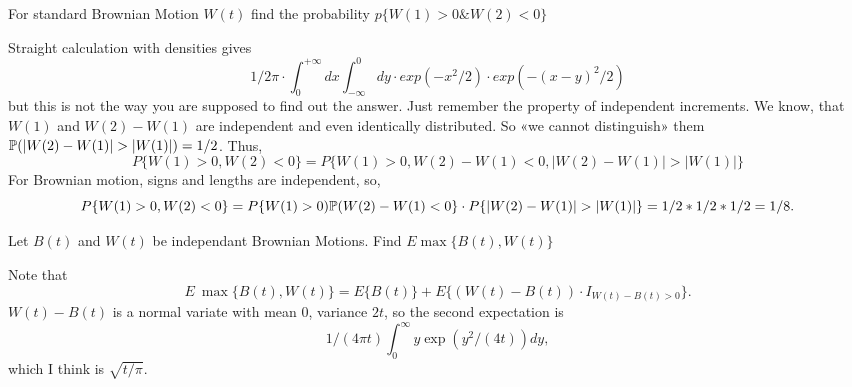 \begin{problem}
For standard Brownian Motion $W(t)$ find the probability $p \{ W(1)>0 \& W(2)<0 \}$


\begin{sol}
Straight calculation with densities gives
\[
  1/2\pi \cdot \int_0^{+\infty}{dx} \int_{-\infty}^0 dy \cdot exp(-x^2/2) \cdot exp(-(x-y)^2/2)
\]
but this is not the way you are supposed to find out the answer.
Just remember the property of independent increments.
We know, that $W(1)$ and $W(2)-W(1)$ are independent and even identically distributed.
So «we cannot distinguish»  them $\P( |W(2)-W(1)| > |W(1)| ) = 1/2$. Thus,
\[
  P\{ W(1)>0, W(2)<0 \} = P\{ W(1)>0, W(2)-W(1) < 0, |W(2)-W(1)| > |W(1)| \}
\]
For Brownian motion, signs and lengths are independent, so,
\[
  P\{ W(1)>0, W(2)<0 \} = P\{ W(1)>0) \P(W(2)-W(1) < 0\} \cdot P\{|W(2)-W(1)| > |W(1)|\} = 1/2*1/2*1/2=1/8.
\]
\end{sol}
\end{problem}

\begin{problem}
Let $B(t)$ and $W(t)$ be independant Brownian Motions. Find $E\max\{B(t),W(t)\}$


\begin{sol}
Note that
\[
  E\ \max\{B(t),W(t)\} =  E \{B(t)\} + E\{(W(t) - B(t))\cdot I_{W(t) - B(t) >0}\}.
\]
$W(t) - B(t)$ is a normal variate with mean $0$, variance $2t$, so the second expectation is
\[
  1/(4\pi t)\int_0^\infty y \exp(y^2/(4t))dy,
\]
which I think is $\sqrt{t/\pi}$.
\end{sol}
\end{problem}

